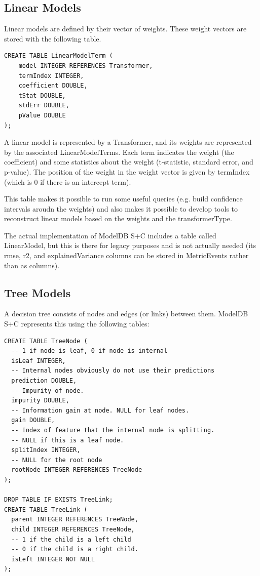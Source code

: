 \subsection{Linear Models}

Linear models are defined by their vector of weights. These weight vectors are
stored with the following table.

\begin{verbatim}
CREATE TABLE LinearModelTerm (
    model INTEGER REFERENCES Transformer,
    termIndex INTEGER,
    coefficient DOUBLE,
    tStat DOUBLE,
    stdErr DOUBLE,
    pValue DOUBLE
);
\end{verbatim}

A linear model is represented by a Transformer, and its weights are represented
by the associated LinearModelTerms. Each term indicates the weight (the coefficient) and
some statistics about the weight (t-statistic, standard error, and p-value). The position
of the weight in the weight vector is given by termIndex (which is 0 if there is an intercept
term).

This table makes it possible to run some useful queries (e.g. build confidence intervals
aroudn the weights) and also makes it possible to develop tools to reconstruct linear models
based on the weights and the transformerType.

The actual implementation of ModelDB S+C includes a table called LinearModel, but this
is there for legacy purposes and is not actually needed (its rmse, r2, and explainedVariance 
columns can be stored in MetricEvents rather than as columns).

\subsection{Tree Models}
A decision tree consists of nodes and edges (or links) between them. ModelDB S+C represents
this using the following tables:

\begin{verbatim}
CREATE TABLE TreeNode (
  -- 1 if node is leaf, 0 if node is internal
  isLeaf INTEGER, 
  -- Internal nodes obviously do not use their predictions
  prediction DOUBLE, 
  -- Impurity of node.
  impurity DOUBLE, 
  -- Information gain at node. NULL for leaf nodes.
  gain DOUBLE, 
  -- Index of feature that the internal node is splitting. 
  -- NULL if this is a leaf node.
  splitIndex INTEGER, 
  -- NULL for the root node
  rootNode INTEGER REFERENCES TreeNode 
);

DROP TABLE IF EXISTS TreeLink;
CREATE TABLE TreeLink (
  parent INTEGER REFERENCES TreeNode,
  child INTEGER REFERENCES TreeNode,
  -- 1 if the child is a left child 
  -- 0 if the child is a right child.
  isLeft INTEGER NOT NULL 
);
\end{verbatim}

